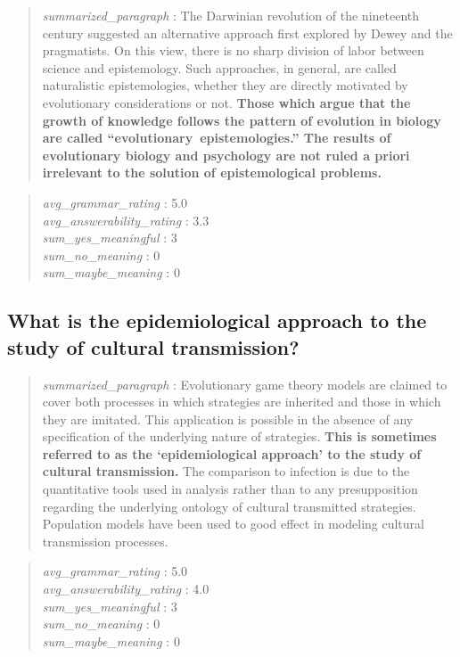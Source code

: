 \begin{quote}
\emph{summarized\_paragraph} : The Darwinian revolution of the
nineteenth century suggested an alternative approach first explored by
Dewey and the pragmatists. On this view, there is no sharp division of
labor between science and epistemology. Such approaches, in general, are
called naturalistic epistemologies, whether they are directly motivated
by evolutionary considerations or not. \textbf{Those which argue that
the growth of knowledge follows the pattern of evolution in biology are
called ``evolutionary~epistemologies.'' The results of evolutionary
biology and psychology are not ruled a priori irrelevant to the solution
of epistemological problems.}
\end{quote}

\begin{quote}
\emph{avg\_grammar\_rating} : 5.0\\
\emph{avg\_answerability\_rating} : 3.3\\
\emph{sum\_yes\_meaningful} : 3\\
\emph{sum\_no\_meaning} : 0\\
\emph{sum\_maybe\_meaning} : 0
\end{quote}

\hypertarget{what-is-the-epidemiological-approach-to-the-study-of-cultural-transmission}{%
\subsection{What is the epidemiological approach to the study of
cultural
transmission?}\label{what-is-the-epidemiological-approach-to-the-study-of-cultural-transmission}}

\begin{quote}
\emph{summarized\_paragraph} : Evolutionary game theory models are
claimed to cover both processes in which strategies are inherited and
those in which they are imitated. This application is possible in the
absence of any specification of the underlying nature of strategies.
\textbf{This is sometimes referred to as the `epidemiological approach'
to the study of cultural transmission.} The comparison to infection is
due to the quantitative tools used in analysis rather than to any
presupposition regarding the underlying ontology of cultural transmitted
strategies. Population models have been used to good effect in modeling
cultural transmission processes.
\end{quote}

\begin{quote}
\emph{avg\_grammar\_rating} : 5.0\\
\emph{avg\_answerability\_rating} : 4.0\\
\emph{sum\_yes\_meaningful} : 3\\
\emph{sum\_no\_meaning} : 0\\
\emph{sum\_maybe\_meaning} : 0
\end{quote}


